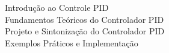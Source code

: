 \documentclass[preview]{standalone}
\begin{document}
Introdução ao Controle PID\\Fundamentos Teóricos do Controlador PID\\Projeto e Sintonização do Controlador PID\\Exemplos Práticos e Implementação\\
\end{document}
